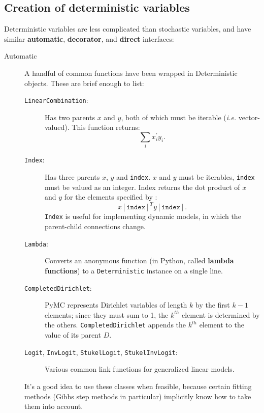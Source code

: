 \subsection*{Creation of deterministic variables}
Deterministic variables are less complicated than stochastic variables, and have similar \textbf{automatic}, \textbf{decorator}, and \textbf{direct} interfaces:
\begin{description}
   \item[Automatic] A handful of common functions have been wrapped in Deterministic objects. These are brief enough to list:
   \begin{description}
      \item[\texttt{LinearCombination}:] Has two parents $x$ and $y$, both of which must be iterable (\emph{i.e.} vector-valued). This function returns:
      \[
      \sum_i x_i^{\prime} y_i.
      \]
      \item[\texttt{Index}:] Has three parents $x$, $y$ and \texttt{index}. $x$ and $y$ must be iterables, \texttt{index} must be valued as an integer. Index returns the dot product of $x$ and $y$ for the elements specified by :
      \[
      x[\mathtt{index}]^T y[\mathtt{index}].
      \]
      \texttt{Index} is useful for implementing dynamic models, in which the parent-child connections change.
      \item[\texttt{Lambda}:] Converts an anonymous function (in Python, called \textbf{lambda functions}) to a \texttt{Deterministic} instance on a single line.
      \item[\texttt{CompletedDirichlet}:] PyMC represents Dirichlet variables of length $k$ by the first $k-1$ elements; since they must sum to 1, the $k^{th}$ element is determined by the others. \texttt{CompletedDirichlet} appends the $k^{th}$ element to the value of its parent $D$.      
      \item[\texttt{Logit}, \texttt{InvLogit}, \texttt{StukelLogit}, \texttt{StukelInvLogit}:] Various common link functions for generalized linear models.
   \end{description}
   It's a good idea to use these classes when feasible, because certain fitting methods (Gibbs step methods in particular) implicitly know how to take them into account.


\end{description}
